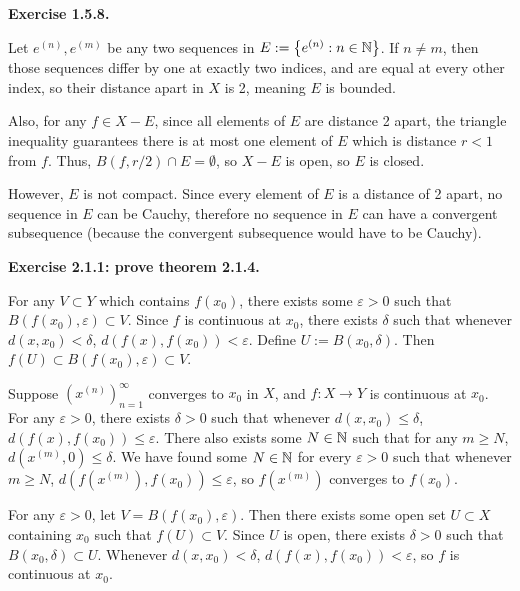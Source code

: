 \documentclass{article}
\begin{document}
\bigskip
\par
\textbf{Exercise 1.5.8.}
\par
Let $e^{(n)}, e^{(m)}$ be any two sequences in $E := \left\{ e^{(n)} : n \in \mathbb{N} \right\}$. If $n \neq m$, then those sequences differ by one at exactly two indices, and are equal at every other index, so their distance apart in $X$ is 2, meaning $E$ is bounded.
\par
Also, for any $f \in X - E$, since all elements of $E$ are distance 2 apart, the triangle inequality guarantees there is at most one element of $E$ which is distance $r < 1$ from $f$. Thus, $B(f, r/2) \cap E = \emptyset$, so $X-E$ is open, so $E$ is closed.
\par
However, $E$ is not compact. Since every element of $E$ is a distance of 2 apart, no sequence in $E$ can be Cauchy, therefore no sequence in $E$ can have a convergent subsequence (because the convergent subsequence would have to be Cauchy).
\bigskip
\par
\textbf{Exercise 2.1.1: prove theorem 2.1.4.}
\par
{} For any $V \subset Y$ which contains $f(x_0)$, there exists some $\varepsilon > 0$ such that $B(f(x_0), \varepsilon) \subset V$. Since $f$ is continuous at $x_0$, there exists $\delta$ such that whenever $d(x, x_0) < \delta$, $d(f(x), f(x_0)) < \varepsilon$. Define $U := B(x_0, \delta)$. Then $f(U) \subset B(f(x_0), \varepsilon) \subset V$.
\par
{} Suppose $ \left( x^{(n)} \right)_{n=1}^\infty$ converges to $x_0$ in $X$, and $f: X \rightarrow Y$ is continuous at $x_0$. For any $\varepsilon > 0$, there exists $\delta > 0$ such that whenever $d(x, x_0) \leq \delta$, $d(f(x), f(x_0)) \leq \varepsilon$. There also exists some $N \in \mathbb{N}$ such that for any $m \geq N$, $d(x^{(m)}, 0) \leq \delta$. We have found some $N \in \mathbb{N}$ for every $\varepsilon > 0$ such that whenever $m \geq N$, $d(f(x^{(m)}), f(x_0)) \leq \varepsilon$, so $f(x^{(m)})$ converges to $f(x_0)$.
\par
{}
\par
{} For any $\varepsilon > 0$, let $V = B(f(x_0), \varepsilon)$. Then there exists some open set $U \subset X$ containing $x_0$ such that $f(U) \subset V$. Since $U$ is open, there exists $\delta > 0$ such that $B(x_0, \delta) \subset U$. Whenever $d(x, x_0) < \delta$, $d(f(x), f(x_0)) < \varepsilon$, so $f$ is continuous at $x_0$.
\bigskip
\par
\end{document}
